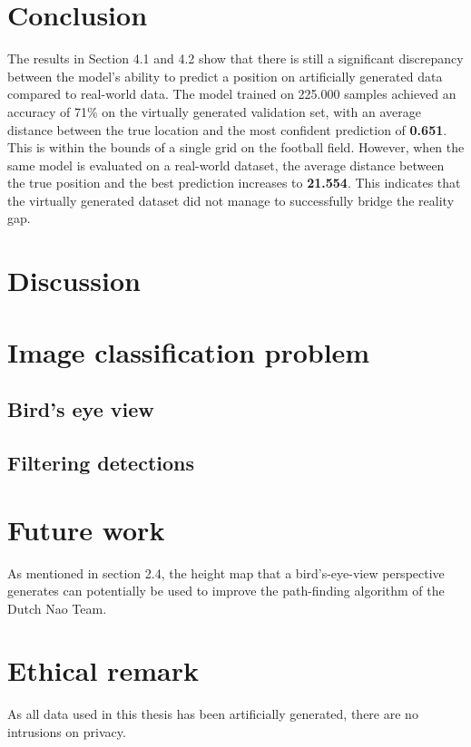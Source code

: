 \documentclass{uva-inf-bachelor-thesis}
\begin{document}
    \section{Conclusion}
        The results in Section 4.1 and 4.2 show that there is still a significant discrepancy between the model's ability to predict a position on artificially generated data compared to real-world data.
        The model trained on 225.000 samples achieved an accuracy of 71\% on the virtually generated validation set, with an average distance between the true location and the most confident prediction of \textbf{0.651}. This is within the bounds of a single grid on the football field. However, when the same model is evaluated on a real-world dataset, the average distance between the true position and the best prediction increases to \textbf{21.554}. This indicates that the virtually generated dataset did not manage to successfully bridge the reality gap.  

    \section{Discussion}

        \section{Image classification problem}

        \subsection{Bird's eye view}

        \subsection{Filtering detections}
        

    \section{Future work}
        As mentioned in section 2.4, the height map that a bird's-eye-view perspective generates can potentially be used to improve the path-finding algorithm of the Dutch Nao Team.

    \section{Ethical remark}
        As all data used in this thesis has been artificially generated, there are no intrusions on privacy. 
\end{document}
